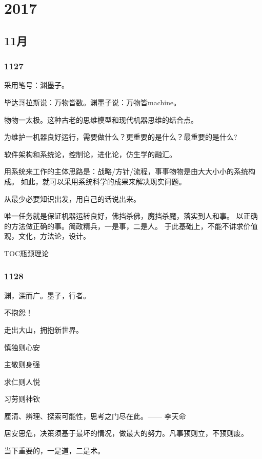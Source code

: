 \chapter{2017}

\section{11月}

\subsection{1127}

采用笔号：渊墨子。

毕达哥拉斯说：万物皆数。渊墨子说：万物皆machine。

物物一太极。这种古老的思维模型和现代机器思维的结合点。

为维护一机器良好运行，需要做什么？更重要的是什么？最重要的是什么?

软件架构和系统论，控制论，进化论，仿生学的融汇。

用系统来工作的主体思路是：战略/方针/流程，事事物物是由大大小小的系统构成。
如此，就可以采用系统科学的成果来解决现实问题。

从最少必要知识出发，用自己的话说出来。

唯一任务就是保证机器运转良好，佛挡杀佛，魔挡杀魔，落实到人和事。
以正确的方法做正确的事。简政精兵，一是事，二是人。
于此基础上，不能不讲求价值观，文化，方法论，设计。

TOC瓶颈理论

\subsection{1128}

渊，深而广。墨子，行者。

不抱怨！

走出大山，拥抱新世界。

\begin{shadequote}

慎独则心安

主敬则身强

求仁则人悦

习劳则神钦

厘清、辨理、探索可能性，思考之门尽在此。—— 李天命
\end{shadequote}

居安思危，决策须基于最坏的情况，做最大的努力。凡事预则立，不预则废。

当下重要的，一是道，二是术。

